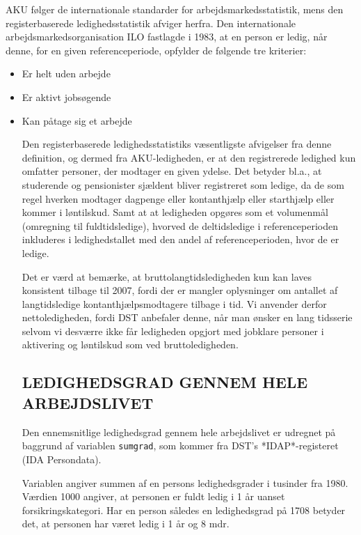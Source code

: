 AKU følger de internationale standarder for arbejdsmarkedsstatistik, mens den registerbaserede  ledighedsstatistik  afviger  herfra.  Den  internationale arbejdsmarkedsorganisation ILO fastlagde i 1983, at en person er ledig, når denne, for en given referenceperiode, opfylder de følgende tre kriterier:
\begin{itemize} [topsep=6pt,itemsep=-1ex]
  \item Er helt uden arbejde
  \item Er aktivt jobsøgende
  \item Kan påtage sig et arbejde

Den registerbaserede ledighedsstatistiks væsentligste afvigelser fra denne definition, og dermed fra AKU-ledigheden, er at den registrerede ledighed kun omfatter personer, der modtager en given
ydelse. Det betyder bl.a., at studerende og pensionister sjældent bliver registreret som ledige, da de som regel hverken modtager dagpenge eller kontanthjælp eller starthjælp eller kommer i løntilskud. Samt at at ledigheden opgøres som et volumenmål (omregning til fuldtidsledige), hvorved de deltidsledige i referenceperioden inkluderes i ledighedstallet med den andel af referenceperioden, hvor de er ledige.

Det er værd at bemærke, at bruttolangtidsledigheden kun kan laves konsistent tilbage til 2007, fordi der er mangler oplysninger om antallet af langtidsledige kontanthjælpsmodtagere tilbage i tid. Vi anvender derfor nettoledigheden, fordi DST anbefaler denne, når man ønsker en lang tidsserie selvom vi desværre ikke får ledigheden opgjort med jobklare personer i aktivering og løntilskud som ved bruttoledigheden.


\subsection{LEDIGHEDSGRAD GENNEM HELE ARBEJDSLIVET \label{}}

Den ennemsnitlige ledighedsgrad gennem hele arbejdslivet er udregnet på baggrund af variablen \texttt{sumgrad}, som kommer fra DST's *IDAP*-registeret (IDA Persondata).

Variablen angiver summen af en persons ledighedsgrader i tusinder fra 1980. Værdien 1000 angiver, at personen er fuldt ledig i 1 år uanset forsikringskategori. Har en person således en ledighedsgrad på 1708 betyder det, at personen har været ledig i 1 år og 8 mdr.


\end{itemize}

